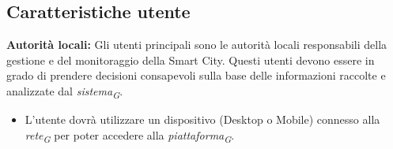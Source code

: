 \subsection{Caratteristiche utente}
\textbf{Autorità locali:} Gli utenti principali sono le autorità locali responsabili della gestione e del monitoraggio della Smart City. Questi utenti devono essere in grado di prendere decisioni consapevoli sulla base delle informazioni raccolte e analizzate dal \textit{sistema}\textsubscript{\textit{G}}.
\begin{itemize}
    \item L'utente dovrà utilizzare un dispositivo (Desktop o Mobile) connesso alla \textit{rete}\textsubscript{\textit{G}} per poter accedere alla \textit{piattaforma}\textsubscript{\textit{G}}.  
\end{itemize}
